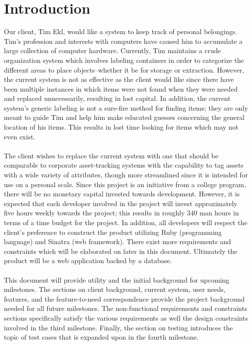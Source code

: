 \documentclass{article}
\begin{document}
\section{Introduction}
Our client, Tim Ekl, would like a system to keep track of personal belongings. Tim's profession and interests with computers have caused him to accumulate a large collection of computer hardware. Currently, Tim maintains a crude organization system which involves labeling containers in order to categorize the different areas to place objects--whether it be for storage or extraction. However, the current system is not as effective as the client would like since there have been multiple instances in which items were not found when they were needed and replaced unnecessarily, resulting in lost capital. In addition, the current system's generic labeling is not a sure-fire method for finding items; they are only meant to guide Tim and help him make educated guesses concerning the general location of his items. This results in lost time looking for items which may not even exist.\\
~\\
The client wishes to replace the current system with one that should be comparable to corporate asset-tracking systems with the capability to tag assets with a wide variety of attributes, though more streamlined since it is intended for use on a personal scale. Since this project is an initiative from a college program, there will be no monetary capital invested towards development. However, it is expected that each developer involved in the project will invest approximately five hours weekly towards the project; this results in roughly 340 man hours in terms of a time budget for the project. In addition, all developers will respect the client's preference to construct the product utilizing Ruby (programming language) and Sinatra (web framework). There exist more requirements and constraints which will be elaborated on later in this document. Ultimately the product will be a web application backed by a database.\\
~\\
This document will provide utility and the initial background for upcoming milestones.  The sections on client background, current system, user needs, features, and the feature-to-need correspondence provide the project background needed for all future milestones. The non-functional requirements and constraints sections specifically satisfy the various requirements as well the design constraints involved in the third milestone.  Finally, the section on testing introduces the topic of test cases that is expanded upon in the fourth milestone.
\end{document}
